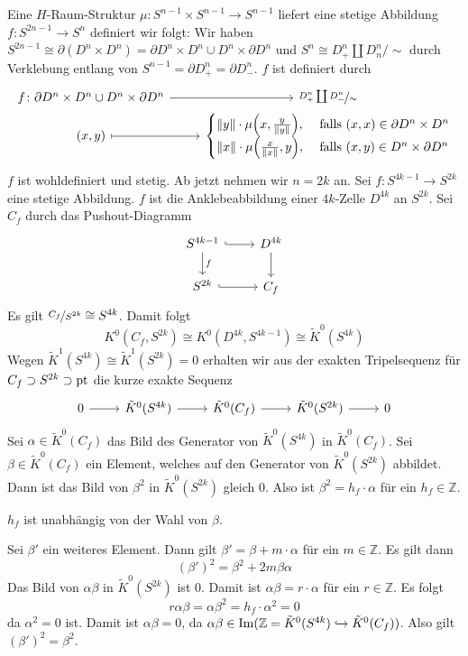 Eine $H$-Raum-Struktur $\mu \colon S^{n-1} \times S^{n-1} \to S^{n-1}$ liefert eine stetige Abbildung $f \colon S^{2n-1} \to S^n$ definiert wir folgt: Wir haben 
$S^{2n-1} \cong \partial (D^n \times D^n) = \partial D^n \times D^n \cup D^n \times \partial D^n$ und  $S^n \cong D^n_+ \coprod D^n_n /\sim$ durch Verklebung
entlang von $S^{n-1} = \partial D^n_+ = \partial D^n_-$. $f$ ist definiert durch
\[
	\begin{tikzcd}[ampersand replacement=\&,row sep=0cm]
		f \colon \partial D^n \times D^n \cup D^n \times \partial D^n \rar \& \nicefrac{D^n_+ \coprod D^n_-}{\sim} \\
		(x,y) \rar[mapsto] \&  {\begin{cases}
			\norm{y} \cdot \mu \enbrace*{x, \frac{y}{\norm{y} } }  , &\text{ falls } (x,x) \in \partial D^n  \times D^n\\
			\norm{x} \cdot \mu \enbrace*{\frac{x}{\norm{x} },y }  , &\text{ falls } (x,y) \in D^n \times \partial D^n
		\end{cases}}
	\end{tikzcd}
\]
$f$ ist wohldefiniert und stetig. Ab jetzt nehmen wir $n=2k$ an. Sei $f \colon S^{4k-1} \to S^{2k}$ eine stetige Abbildung. $f$ ist die Anklebeabbildung einer $4k$-Zelle
$D^{4k}$ an $S^{2k}$. Sei $C_f$ durch das Pushout-Diagramm
\[
	\begin{tikzcd}
		S^{4k-1} \rar[hook] \dar["f"] & D^{4k} \dar\\
		S^{2k} \rar[hook] &C_f
	\end{tikzcd}
\]
Es gilt $\nicefrac{C_f}{S^{2k}} \cong S^{4k}$. Damit folgt
\[
	K^0(C_f,S^{2k}) \cong K^0(D^{4k}, S^{4k-1}) \cong \tilde{K}^0(S^{4k})
\]
Wegen $\tilde{K}^1(S^{4k}) \cong \tilde{K}^1(S^{2k}) =0$ erhalten wir aus der exakten Tripelsequenz für $C_f \supset S^{2k} \supset \mathrm{pt}$ die kurze exakte Sequenz
\[
	\begin{tikzcd}
		0 \rar & \tilde{K}^0(S^{4k}) \rar & \tilde{K}^0(C_f) \rar & \tilde{K}^0(S^{2k}) \rar & 0
	\end{tikzcd}
\]
Sei $\alpha \in \tilde{K}^0(C_f)$ das Bild des Generator von $\tilde{K}^0(S^{4k})$ in $\tilde{K}^0(C_f)$. Sei $\beta \in \tilde{K}^0(C_f)$ ein Element, welches auf den
Generator von $\tilde{K}^0(S^{2k})$ abbildet. Dann ist das Bild von $\beta^2$ in $\tilde{K}^0(S^{2k})$ gleich $0$. Also ist $\beta^2= h_f \cdot \alpha$ für ein 
$h_f \in \mathds{Z}$.


\begin{lemma}[label=sub:45]
$h_f$ ist unabhängig von der Wahl von $\beta$.	
\end{lemma}
\begin{beweis}
Sei $\beta'$ ein weiteres Element. Dann gilt $\beta' = \beta + m \cdot \alpha$ für ein $m \in \mathds{Z}$. Es gilt dann
\[
	(\beta')^2 = \beta^2 + 2m \beta \alpha
\]
Das Bild von $\alpha \beta$ in $\tilde{K}^0(S^{2k})$ ist $0$. Damit ist $\alpha \beta= r \cdot \alpha$ für ein $r \in \mathds{Z}$. Es folgt
\[
	r \alpha \beta = \alpha \beta^2 = h_f \cdot \alpha^2=0
\]
da $\alpha^2=0$ ist.  Damit ist $\alpha \beta=0$, da $\alpha \beta \in \operatorname{Im} (\mathbb{Z}= \tilde{K}^0(S^{4k}) \hookrightarrow \tilde{K}^0(C_f))$. Also gilt 
$(\beta')^2=\beta^2$.	
\end{beweis}


